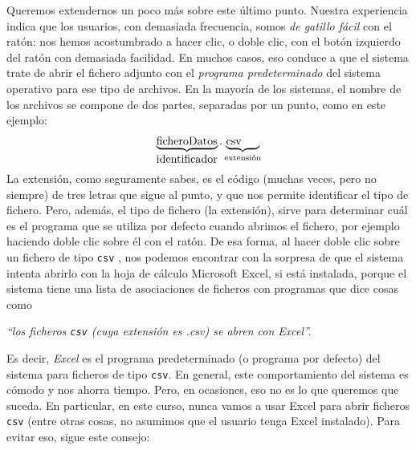 \documentclass[10pt,a4paper]{article}\usepackage[]{graphicx}\usepackage[]{color}
\newcounter {cont01}
\begin{document}
Queremos extendernos un poco más sobre este último punto. Nuestra experiencia indica que los
usuarios, con demasiada frecuencia, somos {\em de gatillo fácil} con el ratón: nos hemos
acostumbrado a hacer clic, o doble clic, con el botón izquierdo del ratón con demasiada
facilidad. En muchos casos, eso conduce a que el sistema trate de abrir el fichero adjunto  con el
{\em programa predeterminado} del sistema operativo para ese tipo de archivos. En la mayoría de los
sistemas, el nombre de los archivos se compone de dos partes, separadas por un punto, como en este
ejemplo:
\[
\underbrace{\mbox{ficheroDatos}}_{\mbox{identificador}}.\underbrace{\mbox{csv}\phantom{aaa}}_{\mbox{\scriptsize extensión}}
\]
La {\sf extensión}, como seguramente sabes, es el código (muchas veces, pero no siempre) de tres
letras que sigue al punto, y que nos permite identificar el tipo de fichero. Pero, además, el tipo
de fichero (la extensión), sirve para determinar cuál es el programa que se utiliza por defecto cuando abrimos el fichero, por ejemplo haciendo doble clic sobre él con el ratón. De esa forma, al hacer doble clic sobre un fichero de tipo {\tt csv} , nos podemos encontrar con la sorpresa de que el sistema intenta abrirlo con la hoja de cálculo Microsoft Excel, si está instalada, porque el sistema tiene
una lista de asociaciones de ficheros con programas que dice cosas como
\begin{center}
{\em ``los ficheros {\tt csv}  (cuya extensión es {.csv}) se abren con Excel''.}
\end{center}
Es decir, {\em Excel} es el {\sf programa predeterminado} (o programa por defecto) del sistema para
ficheros de tipo {\tt csv}. En general, este comportamiento del sistema es cómodo y nos ahorra
tiempo. Pero, en ocasiones, eso no es lo que queremos que suceda. En particular, en este curso,
nunca vamos a usar Excel para abrir ficheros {\tt csv}  (entre otras cosas, no asumimos que el
usuario tenga Excel instalado). Para evitar eso, sigue este consejo:
        \begin{center}
        \end{center}
\end{document}
